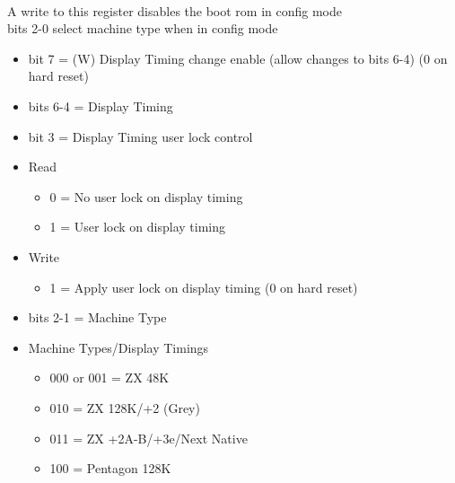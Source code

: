 \\
A write to this register disables the boot rom in config mode\\
bits 2-0 select machine type when in config mode
\begin{itemize}
\item bit 7 = (W) Display Timing change enable (allow changes to
  bits 6-4) (0 on hard reset)
\item bits 6-4 = Display Timing
\item bit 3 = Display Timing user lock control
  \item[] Read
  \begin{itemize}
  \item 0 = No user lock on display timing
  \item 1 = User lock on display timing
  \end{itemize}
  \item[] Write
  \begin{itemize}
  \item 1 = Apply user lock on display timing (0 on hard reset)
  \end{itemize}
\item bits 2-1 = Machine Type
\item[] Machine Types/Display Timings
  \begin{itemize}
  \item 000 or 001 = ZX 48K
  \item 010 = ZX 128K/+2 (Grey)
  \item 011 = ZX +2A-B/+3e/Next Native
  \item 100 = Pentagon 128K
  \end{itemize}
\end{itemize}

